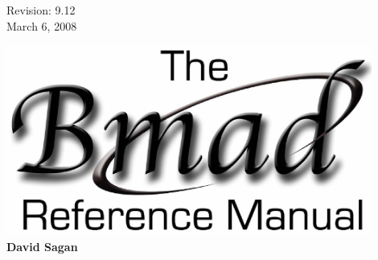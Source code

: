 \thispagestyle{empty}

\begin{flushright}
\large
  Revision: 9.12 \\
  March 6, 2008 \\
\end{flushright}

\vfill

{
\begin{center}
\includegraphics[width=12cm]{bmad-ref-manual.eps} \\
\vskip 0.3in
\huge\bf David Sagan
\end{center}
}

\vfill
\break


